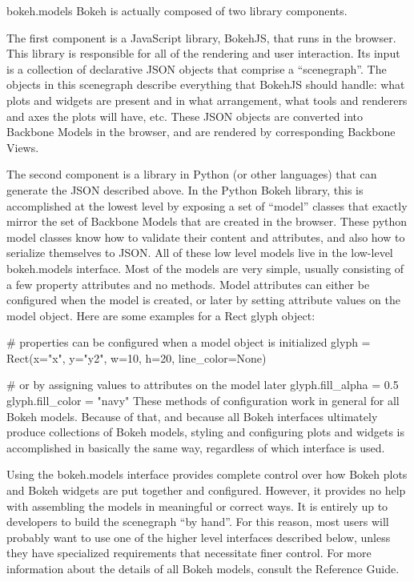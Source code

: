 bokeh.models
Bokeh is actually composed of two library components.

The first component is a JavaScript library, BokehJS, that runs in the browser. This library is responsible for all of the rendering and user interaction. Its input is a collection of declarative JSON objects that comprise a “scenegraph”. The objects in this scenegraph describe everything that BokehJS should handle: what plots and widgets are present and in what arrangement, what tools and renderers and axes the plots will have, etc. These JSON objects are converted into Backbone Models in the browser, and are rendered by corresponding Backbone Views.

The second component is a library in Python (or other languages) that can generate the JSON described above. In the Python Bokeh library, this is accomplished at the lowest level by exposing a set of “model” classes that exactly mirror the set of Backbone Models that are created in the browser. These python model classes know how to validate their content and attributes, and also how to serialize themselves to JSON. All of these low level models live in the low-level bokeh.models interface. Most of the models are very simple, usually consisting of a few property attributes and no methods. Model attributes can either be configured when the model is created, or later by setting attribute values on the model object. Here are some examples for a Rect glyph object:

# properties can be configured when a model object is initialized
glyph = Rect(x="x", y="y2", w=10, h=20, line_color=None)

# or by assigning values to attributes on the model later
glyph.fill_alpha = 0.5
glyph.fill_color = "navy"
These methods of configuration work in general for all Bokeh models. Because of that, and because all Bokeh interfaces ultimately produce collections of Bokeh models, styling and configuring plots and widgets is accomplished in basically the same way, regardless of which interface is used.

Using the bokeh.models interface provides complete control over how Bokeh plots and Bokeh widgets are put together and configured. However, it provides no help with assembling the models in meaningful or correct ways. It is entirely up to developers to build the scenegraph “by hand”. For this reason, most users will probably want to use one of the higher level interfaces described below, unless they have specialized requirements that necessitate finer control. For more information about the details of all Bokeh models, consult the Reference Guide.

